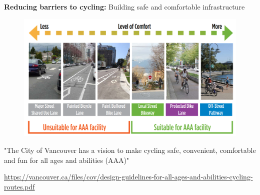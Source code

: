 \documentclass[aspectratio=169]{beamer}
\begin{document}













\begin{frame}
	
	\textbf{Reducing barriers to cycling:} Building safe and comfortable infrastructure 
	
	\begin{figure}
		\centering
		\includegraphics[width=0.85\linewidth]{images/bike_inf_comfort.png}
	\end{figure}

	\small{"The City of Vancouver has a vision to make cycling safe,
		convenient, comfortable and fun for all ages and abilities
		(AAA)"}
	\vspace{2mm}
	
	\tiny\url{https://vancouver.ca/files/cov/design-guidelines-for-all-ages-and-abilities-cycling-routes.pdf}
	
\end{frame}
\end{document}

